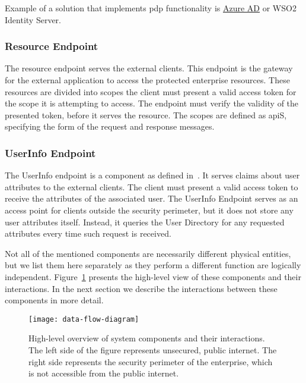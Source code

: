 Example of a solution that implements \acrshort{pdp} functionality is \href{sec:online-access-control}{Azure AD} or WSO2 Identity Server\footnotemark.
% 
    
\subsubsection{Resource Endpoint}
The resource endpoint serves the external clients. This endpoint is the gateway for the external application to access the protected enterprise resources. These resources are divided into scopes the client must present a valid access token for the scope it is attempting to access. The endpoint must verify the validity of the presented token, before it serves the resource. The scopes are defined as \acrshort{api}S, specifying the form of the request and response messages.
    
\subsubsection{UserInfo Endpoint}
The UserInfo endpoint is a component as defined in~\cite{Sakimura2014Final:1}. It serves claims about user attributes to the external clients. The client must present a valid access token to receive the attributes of the associated user. The UserInfo Endpoint serves as an access point for clients outside the security perimeter, but it does not store any user attributes itself. Instead, it queries the User Directory for any requested attributes every time such request is received.

\bigskip\noindent
Not all of the mentioned components are necessarily different physical entities, but we list them here separately as they perform a different function are logically independent. Figure~\ref{fig:data-flow-diagram} presents the high-level view of these components and their interactions. In the next section we describe the interactions between these components in more detail.

\begin{figure}[ht]
    \centering
    \texttt{[image: data-flow-diagram]}
    \caption{High-level overview of system components and their interactions. The left side of the figure represents unsecured, public internet. The right side represents the security perimeter of the enterprise, which is not accessible from the public internet.}
    \label{fig:data-flow-diagram}
\end{figure}